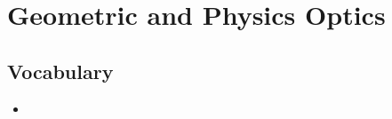 \section{Geometric and Physics Optics}

\subsection{Vocabulary}
\begin{itemize}
    \item 
\end{itemize}

